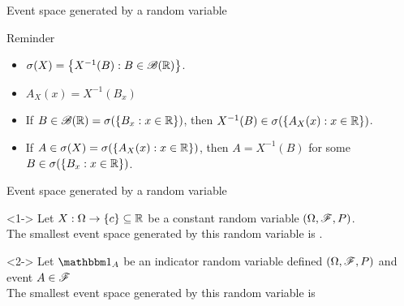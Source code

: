 \documentclass[12pt,aspectratio=169]{beamer}
\begin{document}
\begin{frame}{Event space generated by a random variable}
\begin{block}{Reminder}
\begin{itemize}
\item <1-> $\sigma(X) = \left\{X^{-1}(B): B \in \mathscr{B}(\mathbb{R})\right\}$.
\item <2-> $A_X(x) = X^{-1}(B_x)$  
\item <3-> If $B \in \mathscr{B}(\mathbb{R}) = \sigma(\left\{B_x:x\in \mathbb{R}\right\})$, then $X^{-1}(B) \in \sigma(\left\{A_X(x): x \in \mathbb{R}\right\})$. 
\item <4-> If $A \in \sigma(X) = \sigma(\left\{A_X(x): x \in \mathbb{R}\right\})$, then $A = X^{-1}(B)$ for some $B \in \sigma(\left\{B_x: x \in \mathbb{R}\right\})$.  
\end{itemize}
\end{block}
\end{frame}
\begin{frame}{Event space generated by a random variable}
\begin{Example}<1->
Let $X:\Omega \to \left\{c\right\} \subseteq \mathbb{R}$ be a constant random variable $(\Omega,\mathscr{F},P)$. \\
The smallest event space generated by this random variable is 
. 
\end{Example}
\begin{Example}<2->
Let $\Ind{A}$ be an indicator random variable defined $(\Omega,\mathscr{F},P)$ and event $A \in \mathscr{F}$\\ 
The smallest event space generated by this random variable is 
\end{Example}
\end{frame}
\end{document}
